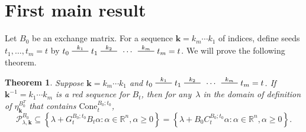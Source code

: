 \documentclass{amsart}
\newtheorem{theorem}[proposition]{Theorem}
\theoremstyle{definition}
\theoremstyle{remark}
\numberwithin{equation}{section}
\newcommand{\reals}{\mathbb R}
\newcommand{\edge}{\,\,\rule[2.7pt]{20pt}{0.5pt}\,\,}
\newcommand{\set}[1]{{\left\lbrace #1 \right\rbrace}}
\newcommand{\0}{{\mathbf{0}}}
\newcommand{\Cone}{\mathrm{Cone}}
\newcommand{\kk}{\mathbf{k}}
\renewcommand{\P}{\mathcal{P}}
\begin{document}
\section{First main result}
Let $B_0$ be an exchange matrix.
For a sequence $\kk=k_m\cdots k_1$ of indices, define seeds $t_1,\ldots,t_m=t$ by $t_0\overset{k_1}{\edge}t_1\overset{k_2}{\edge}\,\cdots\,\overset{k_m}{\edge}t_m=t$.
We will prove the following theorem.
%
%
%
%
%
%
%
%
%
%

\begin{theorem}\label{P in B0C}
Suppose $\kk=k_m\cdots k_1$ and $t_0\overset{k_1}{\edge}t_1\overset{k_2}{\edge}\,\cdots\,\overset{k_m}{\edge}t_m=t$.
If $\kk^{-1}=k_1\cdots k_m$ is a red sequence for $B_t$, then for any~$\lambda$ in the domain of definition of $\eta_\kk^{B_0^T}$ that contains $\Cone^{B_0;t_0}_t$,
\[\P^{B_0}_{\lambda,\kk}\subseteq\set{\lambda+G_t^{B_0;t_0}B_t\alpha:\alpha\in\reals^n,\alpha\ge0}=\set{\lambda+B_0C_t^{B_0;t_0}\alpha:\alpha\in\reals^n,\alpha\ge0}.\]
\end{theorem}
\end{document}
